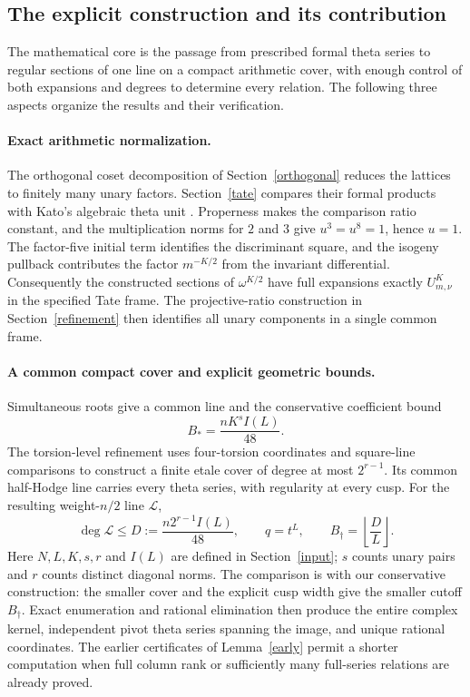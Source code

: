 \documentclass[11pt]{article}
\theoremstyle{remark}\newtheorem{remark}[theorem]{Remark}
\begin{document}
\subsection{The explicit construction and its contribution}
The mathematical core is the passage from prescribed formal theta series
to regular sections of one line on a compact arithmetic cover, with enough
control of both expansions and degrees to determine every relation. The
following three aspects organize the results and their verification.

\paragraph{Exact arithmetic normalization.}
The orthogonal coset decomposition of Section~\ref{orthogonal} reduces the
lattices to finitely many unary factors. Section~\ref{tate} compares their
formal products with Kato's algebraic theta unit \cite{kato,klz}. Properness
makes the comparison ratio constant, and the multiplication norms for
$2$ and $3$ give $u^3=u^8=1$, hence $u=1$. The factor-five initial term
identifies the discriminant square, and the isogeny pullback contributes
the factor $m^{-K/2}$ from the invariant differential. Consequently the
constructed sections of $\omega^{K/2}$ have full expansions exactly
$U_{m,\nu}^K$ in the specified Tate frame. The projective-ratio construction
in Section~\ref{refinement} then identifies all unary components in a
single common frame.

\paragraph{A common compact cover and explicit geometric bounds.}
Simultaneous roots give a common line and the conservative coefficient bound
\[
 B_* = \frac{nK^sI(L)}{48}.
\]
The torsion-level refinement uses four-torsion coordinates and square-line
comparisons to construct a finite etale cover of degree at most $2^{r-1}$.
Its common half-Hodge line carries every theta series, with regularity at
every cusp. For the resulting weight-$n/2$ line $\mathcal L$,
\[
 \deg\mathcal L\leq D:=\frac{n2^{r-1}I(L)}{48},\qquad q=t^L,
 \qquad B_\dagger=\left\lfloor\frac{D}{L}\right\rfloor.
\]
Here $N,L,K,s,r$ and $I(L)$ are defined in Section~\ref{input}; $s$ counts
unary pairs and $r$ counts distinct diagonal norms. The comparison is with
our conservative construction: the smaller cover and the explicit cusp
width give the smaller cutoff $B_\dagger$. Exact enumeration and rational
elimination then produce the entire complex kernel, independent pivot theta
series spanning the image, and unique rational coordinates. The earlier
certificates of Lemma~\ref{early} permit a shorter computation when full
column rank or sufficiently many full-series relations are already proved.
\end{document}

